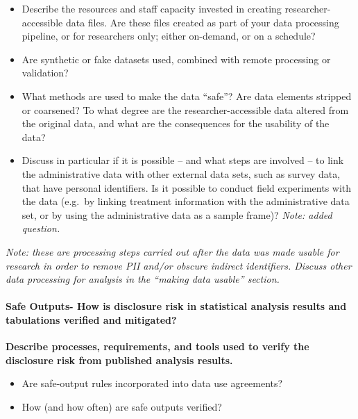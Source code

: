 \documentclass[
]{WileySix}
\providecommand{\tightlist}{%
  \setlength{\itemsep}{0pt}\setlength{\parskip}{0pt}}
\begin{document}
\begin{itemize}
\tightlist
\item
  Describe the resources and staff capacity invested in creating researcher-accessible data files. Are these files created as part of your data processing pipeline, or for researchers only; either on-demand, or on a schedule?
\item
  Are synthetic or fake datasets used, combined with remote processing or validation?
\item
  What methods are used to make the data ``safe''? Are data elements stripped or coarsened? To what degree are the researcher-accessible data altered from the original data, and what are the consequences for the usability of the data?
\item
  Discuss in particular if it is possible -- and what steps are involved -- to link the administrative data with other external data sets, such as survey data, that have personal identifiers. Is it possible to conduct field experiments with the data (e.g.~by linking treatment information with the administrative data set, or by using the administrative data as a sample frame)? \emph{Note: added question.}
\end{itemize}

\emph{Note: these are processing steps carried out after the data was made usable for research in order to remove PII and/or obscure indirect identifiers. Discuss other data processing for analysis in the ``making data usable'' section.}

\hypertarget{safe-outputs--how-is-disclosure-risk-in-statistical-analysis-results-and-tabulations-verified-and-mitigated}{%
\paragraph{Safe Outputs- How is disclosure risk in statistical analysis results and tabulations verified and mitigated?}\label{safe-outputs--how-is-disclosure-risk-in-statistical-analysis-results-and-tabulations-verified-and-mitigated}}

\textbf{Describe processes, requirements, and tools used to verify the disclosure risk from published analysis results.}

\begin{itemize}
\tightlist
\item
  Are safe-output rules incorporated into data use agreements?
\item
  How (and how often) are safe outputs verified?
\end{itemize}
\end{document}
